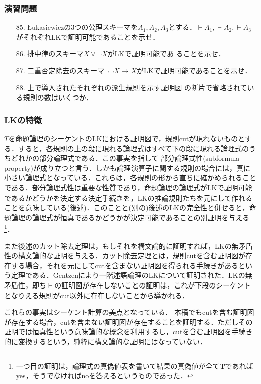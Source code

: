 \documentclass{ltjsarticle}
\theoremstyle{mystyle1}
\theoremstyle{mystyle2}
\newcommand{\bT}{\ensuremath{\mathbf{T}}}
\newcommand{\red}[1]{{\color{red} #1}}
\begin{document}
\subsubsection*{演習問題}
\begin{enumerate}
  \item[85.] \L ukasiewiczの3つの公理スキーマを$A_1, A_2, A_3$とする．$\vdash A_1,\vdash A_2,\vdash A_3$がそれぞれLKで証明可能であることを示せ．
  \item[86.] 排中律のスキーマ$X\vee\neg X$がLKで証明可能であ
  ることを示せ．
  \item[87.] 二重否定除去のスキーマ$\neg\neg X\to X$がLKで証明可能であることを示せ．
  \item[88.] 上で導入されたそれぞれの派生規則を示す証明図
  の断片で省略されている規則の数はいくつか．
\end{enumerate}
\subsubsection{LKの特徴}
$T$を命題論理のシーケントのLKにおける証明図で，規則cutが現れないものとする．すると，各規則の上の段に現れる論理式はすべて下の段に現れる論理式のうちどれかの部分論理式である．この事実を指して\red{部分論理式性}(subformula property)が成り立つと言う．しかも論理演算子に関する規則の場合には，真に小さい論理式となっている．これらは，各規則の形から直ちに確かめられることである．部分論理式性は重要な性質であり，命題論理の論理式がLKで証明可能であるかどうかを決定する決定手続きを，LKの推論規則たちを元にして作れることを意味している(後述)．このことと(別の)後述のLKの完全性と併せると，命題論理の論理式が恒真であるかどうかが決定可能であることの別証明を与える\footnote{一つ目の証明は，論理式の真偽値表を書いて結果の真偽値が全て$\bT$であればyes，そうでなければnoを答えるというものであった．}．

また後述のカット除去定理は，もしそれを構文論的に証明すれば，LKの無矛盾性の構文論的な証明を与える．カット除去定理とは，規則cutを含む証明図が存在する場合，それを元にしてcutを含まない証明図を得られる手続きがあるという定理である．Gentzenにより一階述語論理のLKについて証明された．LKの無矛盾性，即ち$\vdash$の証明図が存在しないことの証明は，これが下段のシーケントとなりえる規則がcut以外に存在しないことから導かれる．

これらの事実はシーケント計算の美点となっている． 本稿でもcutを含む証明図が存在する場合，cutを含まない証明図が存在することを証明する．ただしその証明では恒真性という意味論的な概念を利用するし，cutを含む証明図を手続き的に変換するという，純粋に構文論的な証明にはなっていない．
\end{document}
